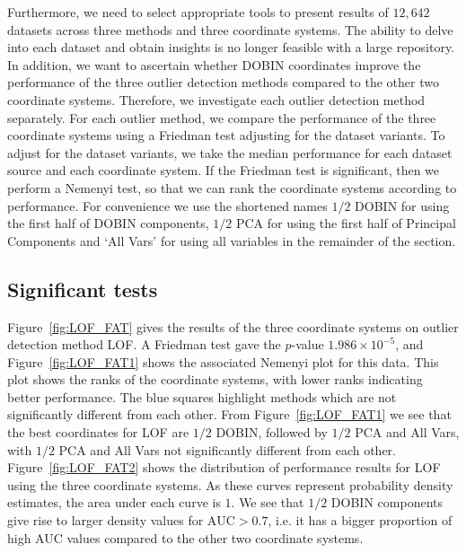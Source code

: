 \documentclass[a4paper,11pt]{article}
\begin{document}
Furthermore, we need to select appropriate tools to present results of $12,642$ datasets across three methods and three coordinate systems. The ability to delve into each dataset and obtain  insights is no longer feasible with a large repository.  In addition, we want to ascertain whether DOBIN coordinates improve the performance of the three outlier detection methods compared to the other two coordinate systems. Therefore, we investigate each outlier detection method separately. For each outlier method, we compare the performance of the three coordinate systems using a Friedman test adjusting for the dataset variants. To adjust for the dataset variants, we take the median performance for each dataset source and each coordinate system.  If the Friedman test is significant, then we perform a Nemenyi test, so that we can rank the  coordinate systems according to performance. For convenience we use the shortened names $1/2$ DOBIN for using the first half of DOBIN components, $1/2$ PCA for using the first half of Principal Components and `All Vars' for using all variables in the remainder of the section.

\subsection{Significant tests}\label{sec:DatRepo1}

Figure~\ref{fig:LOF_FAT} gives the results of the three coordinate systems on  outlier detection method LOF. A Friedman test gave the $p$-value $1.986 \times 10^{-5}$, and Figure~\ref{fig:LOF_FAT1} shows the associated Nemenyi plot for this data. This plot shows the ranks of the coordinate systems, with lower ranks indicating better performance. The blue squares highlight methods which are not significantly different from each other. From Figure~\ref{fig:LOF_FAT1} we see that the best coordinates for LOF are $1/2$ DOBIN, followed by $1/2$ PCA and All Vars, with $1/2$ PCA and  All Vars not significantly different from each other.
Figure~\ref{fig:LOF_FAT2} shows the distribution of performance results for LOF using the three coordinate systems. As these curves represent probability density estimates, the area under each curve is $1$. We see that $1/2$ DOBIN components give rise to larger density values for $\text{AUC} > 0.7$, i.e. it has a bigger proportion of high AUC values compared to the other two coordinate systems.
\end{document}
